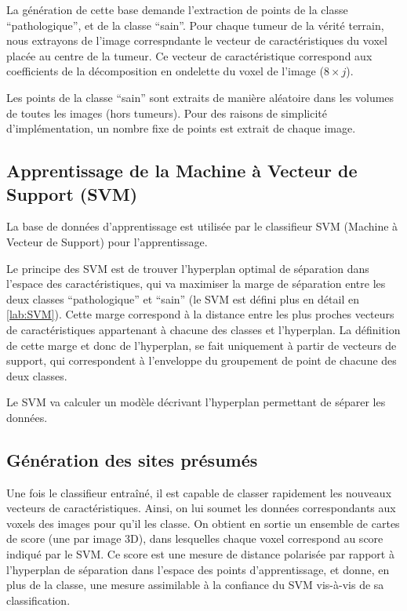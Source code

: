 La génération de cette base demande l'extraction de points de la classe ``pathologique'', et de la classe ``sain''. Pour chaque tumeur de la vérité terrain, nous extrayons de l'image correspndante le vecteur de caractéristiques du voxel placée au centre de la tumeur. Ce vecteur de caractéristique correspond aux coefficients de la décomposition en ondelette du voxel de l'image ($8 \times j$).

Les points de la classe ``sain'' sont extraits de manière aléatoire dans les volumes de toutes les images (hors tumeurs). Pour des raisons de simplicité d'implémentation, un nombre fixe de points est extrait de chaque image.

\subsection{Apprentissage de la Machine à Vecteur de Support (SVM)}

La base de données d'apprentissage est utilisée  par le classifieur SVM (Machine à Vecteur de Support) pour l'apprentissage.

Le principe des SVM est de trouver l’hyperplan optimal de séparation dans l'espace des caractéristiques, qui va maximiser la marge de séparation entre les deux classes ``pathologique''  et ``sain'' (le SVM est défini plus en détail en \ref{lab:SVM}). Cette marge correspond à la distance entre les plus proches vecteurs de caractéristiques appartenant à chacune des classes et l'hyperplan. La définition de cette marge et donc de l’hyperplan, se fait uniquement à partir de vecteurs de support, qui correspondent à l'enveloppe du groupement de point de chacune des deux classes.

Le SVM va calculer un modèle décrivant l'hyperplan permettant de séparer les données.

\subsection{Génération des sites présumés}
\label{lab:aggregatsCAD}
Une fois le classifieur entraîné, il est capable de classer rapidement les nouveaux vecteurs de caractéristiques. Ainsi, on lui soumet les données correspondants aux voxels des images pour qu'il les classe. On obtient en sortie un ensemble de cartes de score (une par image 3D), dans lesquelles chaque voxel correspond au score indiqué par le SVM. Ce score est une mesure de distance polarisée par rapport à l'hyperplan de séparation dans l'espace des points d'apprentissage, et donne, en plus de la classe, une mesure assimilable à la confiance du SVM vis-à-vis de sa classification.

